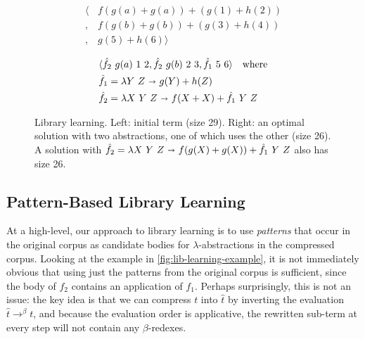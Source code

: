 \documentclass[acmsmall,screen,nonacm,review=false,timestamp=false]{acmart}
\newcommand{\bnd}{\ \mathbf{\shortrightarrow}\ }
\newcommand{\rewrites}[1]{\rightarrow^{#1}}
\newcommand{\evals}{\rewrites{\beta}}
\begin{document}
\begin{figure}
  \begin{minipage}{.5\textwidth}
    \begin{align*}
      \langle &f(g(a) + g(a)) + (g(1) + h(2))\\
      ,\ &f(g(b) + g(b)) + (g(3) + h(4))\\
      ,\ &g(5) + h(6) \rangle
    \end{align*}
  \end{minipage}\begin{minipage}{.5\textwidth}
    \begin{align*}
      &\langle \hat{f}_2\ g(a)\ 1\ 2, \hat{f}_2\ g(b)\ 2\ 3, \hat{f}_1\ 5\ 6\rangle\quad \text{where}\\
      &\hat{f}_1 = \lambda Y\ Z \bnd g(Y) + h(Z)\\
      &\hat{f}_2 = \lambda X\ Y\ Z \bnd f(X + X) + \hat{f}_1\ Y\ Z
    \end{align*}
  \end{minipage}
  \caption{Library learning.
           Left: initial term (size 29).
           Right: an optimal solution with two abstractions, one of which uses the other (size 26).
           A solution with $\hat{f}_2 = \lambda X\ Y\ Z \bnd f(g(X) + g(X)) + \hat{f}_1\ Y\ Z$ also has size 26.}\label{fig:lib-learning-example}
\end{figure}


\subsection{Pattern-Based Library Learning}

At a high-level, our approach to library learning
is to use \emph{patterns} that occur in the original corpus
as candidate bodies for $\lambda$-abstractions in the compressed corpus.
Looking at the example in \autoref{fig:lib-learning-example},
it is not immediately obvious that using just the patterns from the original corpus is sufficient,
since the body of $f_2$ contains an application of $f_1$.
Perhaps surprisingly, this is not an issue:
the key idea is that we can compress $t$ into $\hat{t}$ by inverting the evaluation $\hat{t} \evals t$,
and because the evaluation order is applicative,
the rewritten sub-term at every step will not contain any $\beta$-redexes.
\end{document}
